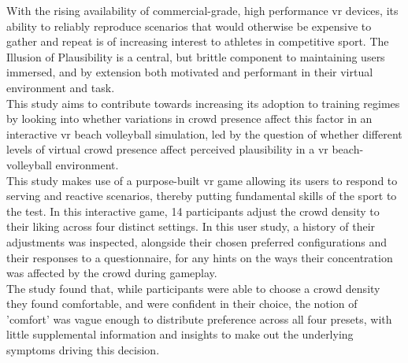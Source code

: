 \documentclass[a4paper, 12pt, oneside]{report}         %
\begin{document}

\thesistitlepage                                  %

\thesisdeclarationpage                            %

\thesispermissionpage                             %

\begin{thesisabstract}                            %
With the rising availability of commercial-grade, high performance \gls{vr} devices, its ability to reliably reproduce scenarios that would otherwise be expensive to gather and repeat is of increasing interest to athletes in competitive sport. The Illusion of Plausibility is a central, but brittle component to maintaining users immersed, and by extension both motivated and performant in their virtual environment and task.\\
This study aims to contribute towards increasing its adoption to training regimes by looking into whether variations in crowd presence affect this factor in an interactive \gls{vr} beach volleyball simulation, led by the question of whether different levels of virtual crowd presence affect perceived plausibility in a \gls{vr} beach-volleyball environment.\\
This study makes use of a purpose-built \gls{vr} game allowing its users to respond to serving and reactive scenarios, thereby putting fundamental skills of the sport to the test. In this interactive game, 14 participants adjust the crowd density to their liking across four distinct settings. In this user study, a history of their adjustments was inspected, alongside their chosen preferred configurations and their responses to a questionnaire, for any hints on the ways their concentration was affected by the crowd during gameplay.\\
The study found that, while participants were able to choose a crowd density they found comfortable, and were confident in their choice, the notion of 'comfort' was vague enough to distribute preference across all four presets, with little supplemental information and insights to make out the underlying symptoms driving this decision.
\end{thesisabstract}

\end{document}
